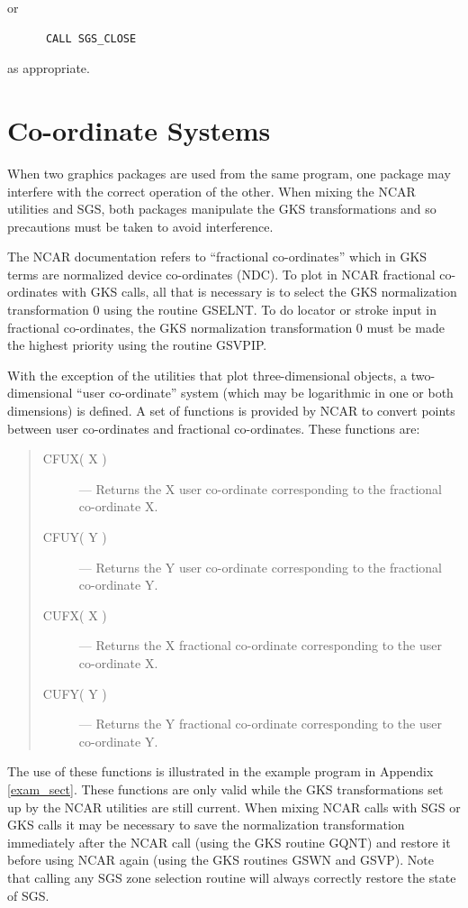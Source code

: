 \documentclass[twoside,11pt]{article}
\newcommand{\xlabel}[1]{}
\renewcommand{\_}{\texttt{\symbol{95}}}
\begin{document}
or

\begin{verbatim}
      CALL SGS_CLOSE
\end{verbatim}

as appropriate.


\section{\xlabel{coordinate_systems_labelcoord_sect}Co-ordinate Systems}
\label{co-ord_sect}

When two graphics packages are used from the same program, one package may
interfere with the correct operation of the other. 
When mixing the NCAR
utilities and SGS, both packages manipulate the GKS transformations and
so precautions must be taken to avoid interference.

The NCAR documentation refers to ``fractional co-ordinates'' which in
GKS terms are normalized device co-ordinates (NDC). 
To plot in NCAR fractional co-ordinates with GKS calls, all that is 
necessary is to select the GKS normalization transformation 0 using the 
routine GSELNT. 
To do locator or stroke input in fractional co-ordinates, the GKS normalization 
transformation 0 must be made the highest priority using the routine 
GSVPIP.

With the exception of the utilities that plot three-dimensional objects, a 
two-dimensional ``user co-ordinate'' system (which may be logarithmic in one or
both dimensions) is defined. 
A set of functions is provided by NCAR to convert points between user
co-ordinates and fractional co-ordinates.
These functions are:

\begin{quote}
\begin{description}
\item [CFUX( X )] ---
 Returns the X user co-ordinate corresponding to the fractional co-ordinate X.
\item [CFUY( Y )] ---
 Returns the Y user co-ordinate corresponding to the fractional co-ordinate Y.
\item [CUFX( X )] ---
 Returns the X fractional co-ordinate corresponding to the user co-ordinate X.
\item [CUFY( Y )] ---
 Returns the Y fractional co-ordinate corresponding to the user co-ordinate Y.
\end{description}
\end{quote}

The use of these functions is illustrated in the example program in Appendix 
\ref{exam_sect}.
These functions are only valid while the GKS transformations set up by the NCAR
utilities are still current.
When mixing NCAR calls with SGS or GKS calls it may be necessary to save the
normalization transformation immediately after the NCAR call (using the GKS
routine GQNT) and restore it before using NCAR again (using the GKS routines 
GSWN and GSVP).
Note that calling any SGS zone selection routine will always correctly restore
the state of SGS.
\end{document}
